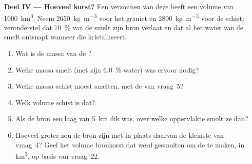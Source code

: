 \begin{problem}
\noindent\textbf{Deel IV --- Hoeveel korst?}
Een verzonnen  van deze  heeft een volume van \qty{1000}{\cubic\kilo\metre}.
Neem \qty{2650}{\kilogram\per\cubic\metre} voor het graniet en
\qty{2800}{\kilogram\per\cubic\metre} voor de schist; veronderstel dat \qty{70}{\percent} van de
smelt zijn bron verlaat en dat al het water van de smelt ontsnapt wanneer die kristalliseert.
\begin{enumerate}[resume]
\item Wat is de massa van de ?
\item Welke massa smelt (met zijn \qty{6.0}{\percent} water) was ervoor nodig?
\item Welke massa schist moest smelten, met de  van vraag~5?
\item Welk volume schist is dat?
\item Als de bron een laag van \qty{5}{km} dik was, over welke oppervlakte smolt ze dan?
\item Hoeveel groter zou de bron zijn met in plaats daarvan de kleinste  van vraag~4? Geef het volume
bronkorst dat werd gesmolten om de  te maken, in
\unit{\cubic\kilo\metre}, op basis van vraag~22.
\end{enumerate}
\end{problem}
